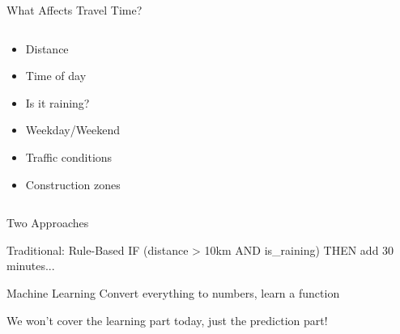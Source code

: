 \documentclass[10pt]{beamer}
\begin{document}
\begin{frame}{What Affects Travel Time?}
  \begin{columns}[T]
    \begin{column}{0.5\textwidth}
      \begin{itemize}
        \item Distance
        \item Time of day
        \item Is it raining?
        \item Weekday/Weekend
        \item Traffic conditions
        \item Construction zones
      \end{itemize}
    \end{column}
    \begin{column}{0.5\textwidth}
    \end{column}
  \end{columns}
\end{frame}

\begin{frame}{Two Approaches}
  \begin{block}{Traditional: Rule-Based}
    IF (distance > 10km AND is\_raining) THEN add 30 minutes...
  \end{block}
  
  \vspace{1em}
  
  \begin{block}{Machine Learning}
    Convert everything to numbers, learn a function
  \end{block}
  
  \vspace{1em}
  \small We won't cover the learning part today, just the prediction part!
\end{frame}
\end{document}
